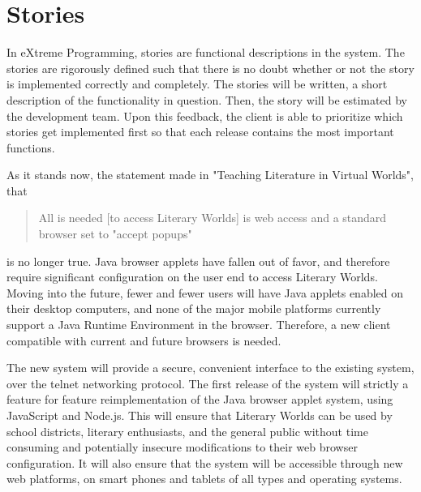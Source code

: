 \documentclass[12pt, letterpaper]{report}
\begin{document}
%
\chapter{Stories}
\par
In eXtreme Programming, stories are functional descriptions in the system. The stories are rigorously defined such that there is no doubt whether or not the story is implemented correctly and completely. The stories will be written, a short description of the functionality in question. Then, the story will be estimated by the development team. Upon this feedback, the client is able to prioritize which stories get implemented first so that each release contains the most important functions.

\par
As it stands now, the statement made in "Teaching Literature in Virtual Worlds", that 

\begin{quotation}
All is needed [to access Literary Worlds] is web access and a standard browser set to "accept popups" \cite[9]{Webb}
\end{quotation}
is no longer true. Java browser applets have fallen out of favor, and therefore require significant configuration on the user end to access Literary Worlds. Moving into the future, fewer and fewer users will have Java applets enabled on their desktop computers, and none of the major mobile platforms currently support a Java Runtime Environment in the browser. Therefore, a new client compatible with current and future browsers is needed.

\par
The new system will provide a secure, convenient interface to the existing system, over the telnet networking protocol. The first release of the system will strictly a feature for feature reimplementation of the Java browser applet system, using JavaScript and Node.js. This will ensure that Literary Worlds can be used by school districts, literary enthusiasts, and the general public without time consuming and potentially insecure modifications to their web browser configuration. It will also ensure that the system will be accessible through new web platforms, on smart phones and tablets of all types and operating systems.
\end{document}
